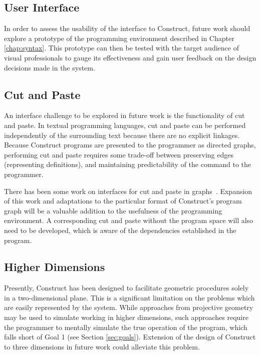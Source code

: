 \documentclass[twoside,openright,11pt]{report}
\begin{document}
\subsection{User Interface}

In order to assess the usability of the interface to Construct, future work should explore a prototype of the programming environment described in Chapter \ref{chap:syntax}.
This prototype can then be tested with the target audience of visual professionals to gauge its effectiveness and gain user feedback on the design decisions made in the system.

\subsection{Cut and Paste}

An interface challenge to be explored in future work is the functionality of cut and paste. 
In textual programming languages, cut and paste can be performed independently of the surrounding text because there are no explicit linkages.
Because Construct programs are presented to the programmer as directed graphs, performing cut and paste requires some trade-off between preserving edges (representing definitions), and maintaining predictability of the command to the programmer.

There has been some work on interfaces for cut and paste in graphs~\cite{ibrahim1998graphpaste}.
Expansion of this work and adaptations to the particular format of Construct's program graph will be a valuable addition to the usefulness of the programming environment.
A corresponding cut and paste without the program space will also need to be developed, which is aware of the dependencies established in the program.

\subsection{Higher Dimensions}

Presently, Construct has been designed to facilitate geometric procedures solely in a two-dimensional plane. 
This is a significant limitation on the problems which are easily represented by the system. 
While approaches from projective geometry may be used to simulate working in higher dimensions, such approaches require the programmer to mentally simulate the true operation of the program, which falls short of Goal 1 (see Section \ref{sec:goals}).
Extension of the design of Construct to three dimensions in future work could alleviate this problem.
\end{document}
